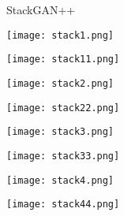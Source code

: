 \documentclass{article}
\begin{document}
\begin{figure}[t]
\begin{minipage}{0.12\textwidth}\raggedright
\scriptsize{StackGAN++ \cite{zhang2018stackgan++}}\\
\end{minipage}
\quad\begin{minipage}{0.10\textwidth}
\texttt{[image: stack1.png]}
\end{minipage}
\noindent\begin{minipage}{0.10\textwidth}
\texttt{[image: stack11.png]}
\end{minipage}
\noindent\begin{minipage}{0.10\textwidth}
\texttt{[image: stack2.png]}
\end{minipage}
\noindent\begin{minipage}{0.10\textwidth}
\texttt{[image: stack22.png]}
\end{minipage}
\noindent\begin{minipage}{0.10\textwidth}
\texttt{[image: stack3.png]}
\end{minipage}
\noindent\begin{minipage}{0.10\textwidth}
\texttt{[image: stack33.png]}
\end{minipage}
\noindent\begin{minipage}{0.10\textwidth}
\texttt{[image: stack4.png]}
\end{minipage}
\noindent\begin{minipage}{0.10\textwidth}
\texttt{[image: stack44.png]}
\end{minipage}
\hfill 


\end{figure}
\end{document}
